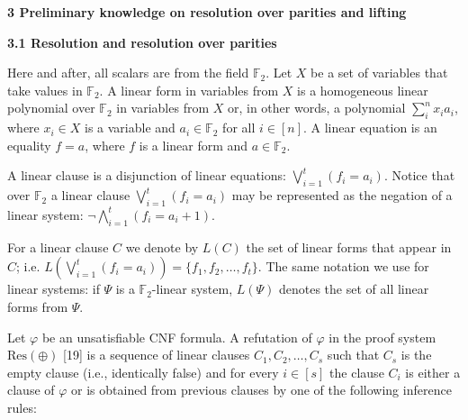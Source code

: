 \documentclass[10pt,a4paper]{article}
\begin{document}
\par\medskip\noindent\textbf{
3 Preliminary knowledge on resolution over parities and lifting}\par

\par\medskip\noindent\textbf{
3.1 Resolution and resolution over parities}\par


Here and after, all scalars are from the field $\mathbb{F}_{2}$. Let $X$ be a set of variables that take values in $\mathbb{F}_{2}$.
A linear form in variables from $X$ is a homogeneous linear polynomial over $\mathbb{F}_{2}$ in variables from $X$ or, in other words, a polynomial $\sum_{i}^{n}x_{i}a_{i}$, where $x_{i}\in X$ is a variable and $a_{i}\in\mathbb{F}_{2}$ for all $i\in[n]$. A linear equation is an equality $f=a$, where $f$ is a linear form and $a\in\mathbb{F}_{2}$.\par



A linear clause is a disjunction of linear equations: $\bigvee_{i=1}^{t}(f_{i}=a_{i})$.
Notice that over $\mathbb{F}_{2}$ a linear clause $\bigvee_{i=1}^{t}(f_{i}=a_{i})$ may be represented as the negation of a linear system: $\lnot\bigwedge_{i=1}^{t}(f_{i}=a_{i}+1)$.\par



For a linear clause $C$ we denote by $L(C)$ the set of linear forms that appear in $C$; i.e. $L\left(\bigvee_{i=1}^{t}(f_{i}=a_{i})\right)=\{f_{1},f_{2},\dots,f_{t}\}$. The same notation we use for linear systems: if $\Psi$ is a $\mathbb{F}_{2}$-linear system, $L(\Psi)$ denotes the set of all linear forms from $\Psi$.\par



Let $\varphi$ be an unsatisfiable CNF formula.
A refutation of $\varphi$ in the proof system $\mathrm{Res}(\oplus)$ [19] is a sequence of linear clauses $C_{1},C_{2},\dots,C_{s}$ such that $C_{s}$ is the empty clause (i.e., identically false) and for every $i\in[s]$ the clause $C_{i}$ is either a clause of $\varphi$ or is obtained from previous clauses by one of the following inference rules:\par
\end{document}
